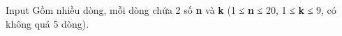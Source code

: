 Input
Gồm nhiều dòng, mỗi dòng chứa 2 số   \textbf{n}   và   \textbf{k}   (1 ≤   \textbf{n}   ≤ 20, 1 ≤   \textbf{k}   ≤ 9, có không quá 5 dòng).
